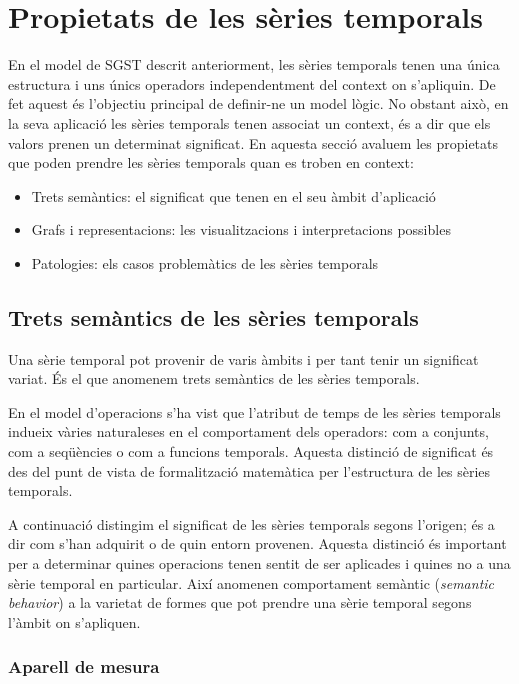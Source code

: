 \section{Propietats de les sèries temporals}

En el model de \gls{SGST} descrit anteriorment, les sèries temporals
tenen una única estructura i uns únics operadors independentment del
context on s'apliquin. De fet aquest és l'objectiu principal de
definir-ne un model lògic. No obstant això, en la seva aplicació les
sèries temporals tenen associat un context, és a dir que els valors
prenen un determinat significat. En aquesta secció avaluem les
propietats que poden prendre les sèries temporals quan es troben en
context:
\begin{itemize}
\item Trets semàntics: el significat que tenen en
  el seu àmbit d'aplicació
\item Grafs i representacions: les visualitzacions i interpretacions
  possibles
\item Patologies: els casos problemàtics de les sèries temporals
\end{itemize}




\subsection{Trets semàntics de les sèries temporals}

Una sèrie temporal pot provenir de varis àmbits i per tant tenir un
significat variat. És el que anomenem trets semàntics de les sèries
temporals.


En el model d'operacions s'ha vist que l'atribut de temps de les
sèries temporals indueix vàries naturaleses en el comportament dels
operadors: com a conjunts, com a seqüències o com a funcions
temporals. Aquesta distinció de significat és des del punt de
vista de formalització matemàtica per l'estructura de les sèries
temporals.

A continuació distingim el significat de les sèries temporals segons
l'origen; és a dir com s'han adquirit o de quin entorn
provenen. Aquesta distinció és important per a determinar quines
operacions tenen sentit de ser aplicades i quines no a una sèrie
temporal en particular. Així \textcite{segev87:sigmod} anomenen
comportament semàntic (\emph{semantic behavior}) a la varietat de
formes que pot prendre una sèrie temporal segons l'àmbit on
s'apliquen.


\subsubsection{Aparell de mesura}

